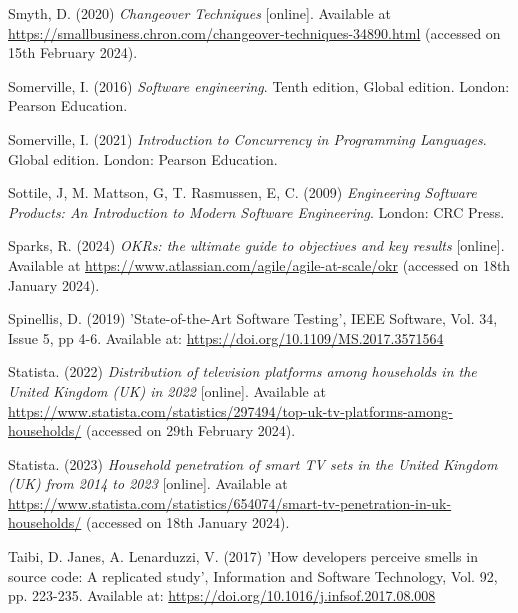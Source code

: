 \noindent Smyth, D. (2020) \textit{Changeover Techniques} [online]. Available at \url{https://smallbusiness.chron.com/changeover-techniques-34890.html} (accessed on 15th February 2024).
\vspace{0.2cm}

\noindent Somerville, I. (2016) \textit{Software engineering}. Tenth edition, Global edition. London: Pearson Education.
\vspace{0.2cm}

\noindent Somerville, I. (2021) \textit{Introduction to Concurrency in Programming Languages}. Global edition. London: Pearson Education.
\vspace{0.2cm}

\noindent Sottile, J, M. Mattson, G, T. Rasmussen, E, C. (2009) \textit{Engineering Software Products: An Introduction to Modern Software Engineering}. London: CRC Press.
\vspace{0.2cm}

\noindent Sparks, R. (2024) \textit{OKRs: the ultimate guide to objectives and key results} [online]. Available at \url{https://www.atlassian.com/agile/agile-at-scale/okr} (accessed on 18th January 2024).
\vspace{0.2cm}

\noindent Spinellis, D. (2019) 'State-of-the-Art Software Testing', IEEE Software, Vol. 34, Issue 5, pp 4-6. Available at: \url{https://doi.org/10.1109/MS.2017.3571564}
\vspace{0.2cm}

\noindent Statista. (2022) \textit{Distribution of television platforms among households in the United Kingdom (UK) in 2022} [online]. Available at \url{https://www.statista.com/statistics/297494/top-uk-tv-platforms-among-households/} (accessed on 29th February 2024).
\vspace{0.2cm}

\noindent Statista. (2023) \textit{Household penetration of smart TV sets in the United Kingdom (UK) from 2014 to 2023} [online]. Available at \url{https://www.statista.com/statistics/654074/smart-tv-penetration-in-uk-households/} (accessed on 18th January 2024).
\vspace{0.2cm}

\noindent Taibi, D. Janes, A. Lenarduzzi, V. (2017) 'How developers perceive smells in source code: A replicated study', Information and Software Technology, Vol. 92, pp. 223-235. Available at: \url{https://doi.org/10.1016/j.infsof.2017.08.008}
\vspace{0.2cm}

